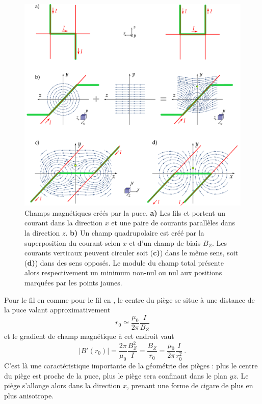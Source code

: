 \begin{figure}[]
\centering
\includegraphics[width=\linewidth]{figures/setup/coldatoms/magfields_chip}
\caption[Champs magnétiques créés par la puce]{
Champs magnétiques créés par la puce.
\textbf{a)} Les fils  et  portent un courant dans la direction $x$ et une paire de courants parallèles dans la direction $z$.
\textbf{b)} Un champ quadrupolaire est créé par la superposition du courant selon $x$ et d'un champ de biais $B_Z$.
Les courants verticaux peuvent circuler soit (\textbf{c)}) dans le même sens,  soit (\textbf{d)}) dans des sens opposés.
Le module du champ total présente alors respectivement un minimum non-nul ou nul aux positions marquées par les points jaunes.
}
\label{fig:magfields_chip}
\end{figure}

Pour le fil en  comme pour le fil en , le centre du piège se situe à une distance de la puce valant approximativement
\begin{equation}
\label{eq:trap_center}
r_0 \simeq \frac{\mu _0}{2\pi}\frac{I}{B_Z}
\end{equation}
et le gradient de champ magnétique à cet endroit vaut
\begin{equation}
\label{eq:trap_center_grad}
|B'(r_0)|=\frac{2\pi}{\mu _0} \frac{B_Z^2}{I} = \frac{B_Z}{r_0} = \frac{\mu _0}{2\pi}\frac{I}{r_0^2}~.
\end{equation}
%
C'est là une caractéristique importante de la géométrie des pièges : plus le centre du piège est proche de la puce, plus le piège sera confinant dans le plan $yz$.
Le piège s'allonge alors dans la direction $x$, prenant une forme de cigare de plus en plus anisotrope.

